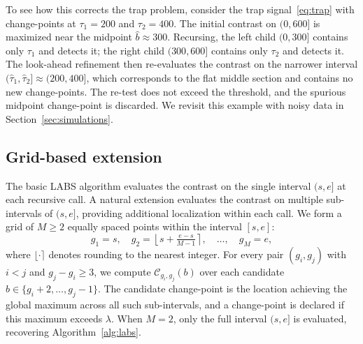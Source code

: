 \documentclass[12pt, a4paper]{article}
\begin{document}
To see how this corrects the trap problem, consider the trap signal~\eqref{eq:trap} with change-points at $\tau_1 = 200$ and $\tau_2 = 400$. The initial contrast on $(0, 600]$ is maximized near the midpoint $\hat{b} \approx 300$. Recursing, the left child $(0, 300]$ contains only $\tau_1$ and detects it; the right child $(300, 600]$ contains only $\tau_2$ and detects it. The look-ahead refinement then re-evaluates the contrast on the narrower interval $(\hat{\tau}_1, \hat{\tau}_2] \approx (200, 400]$, which corresponds to the flat middle section and contains no new change-points. The re-test does not exceed the threshold, and the spurious midpoint change-point is discarded. We revisit this example with noisy data in Section~\ref{sec:simulations}.


\subsection{Grid-based extension}
\label{sec:grid}

The basic LABS algorithm evaluates the contrast on the single interval $(s, e]$ at each recursive call. A natural extension evaluates the contrast on multiple sub-intervals of $(s, e]$, providing additional localization within each call. We form a grid of $M \geq 2$ equally spaced points within the interval $[s, e]$:
\[
g_1 = s, \quad g_2 = \left\lfloor s + \tfrac{e - s}{M - 1} \right\rceil, \quad \ldots, \quad g_M = e,
\]
where $\lfloor \cdot \rceil$ denotes rounding to the nearest integer. For every pair $(g_i, g_j)$ with $i < j$ and $g_j - g_i \geq 3$, we compute $\mathcal{C}_{g_i, g_j}(b)$ over each candidate $b \in \{g_i+2, \ldots, g_j-1\}$. The candidate change-point is the location achieving the global maximum across all such sub-intervals, and a change-point is declared if this maximum exceeds $\lambda$. When $M = 2$, only the full interval $(s, e]$ is evaluated, recovering Algorithm~\ref{alg:labs}.
\end{document}
